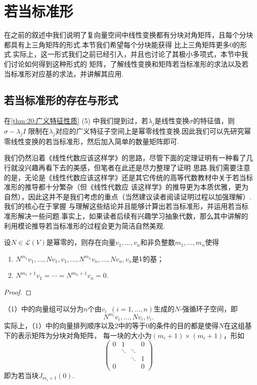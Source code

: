\chapter{若当标准形}

在之前的叙述中我们说明了复向量空间中线性变换都有分块对角矩阵，且每个分块都具有上三角矩阵的形式.本节我们希望每个分块能获得
比上三角矩阵更多0的形式.实际上，这一形式我们之前已经引入，并且也讨论了其极小多项式，本节中我们讨论如何得到这种形式的
矩阵，了解线性变换和矩阵若当标准形的求法以及若当标准形对应基的求法，并讲解其应用.

\section{若当标准形的存在与形式}
在\autoref{thm:20:广义特征性质} (5) 中我们提到过，若$\lambda_j$是线性变换$\sigma$的特征值，则$\sigma-\lambda_jI$
限制在$\lambda_j$对应的广义特征子空间上是幂零线性变换.因此我们可以先研究幂零线性变换的若当标准形，然后加入简单的数量矩阵即可.

我们仍然沿着《线性代数应该这样学》的思路，尽管下面的定理证明有一种看了几行就没兴趣再看下去的美感，但笔者在此还是尽力整理了证明
思路.我们需要注意的是，无论是《线性代数应该这样学》还是其它传统的高等代数教材中关于若当标准形的推导都十分繁杂（但《线性代数应
该这样学》的推导更为本质优雅，更为自然），因此这并不是我们考虑的重点（当然建议读者阅读证明过程以加强理解）.我们的核心在于掌握
与理解这些结论并且能够计算出若当标准形，并运用若当标准形解决一些问题.事实上，如果读者后续有兴趣学习抽象代数，那么其中讲解的
利用模论推导若当标准形的过程会更为简洁自然美观.
\begin{theorem} \label{thm:22:若当基存在}
    设$N\in \mathcal{L}(V)$是幂零的，则存在向量$v_1,\ldots,v_n$和非负整数$m_1,\ldots,m_n$使得
    \begin{enumerate}[label=(\arabic*)]
        \item $N^{m_1}v_1,\ldots,Nv_1,v_1,\ldots,N^{m_n}v_n,\ldots,Nv_n,v_n$是$V$的基；

        \item $N^{m_1+1}v_1=\cdots=N^{m_n+1}v_n=0$.
    \end{enumerate}
\end{theorem}
\begin{proof}
    
\end{proof}

（1）中的向量组可以分为$n$个由$v_i\enspace(i=1,\ldots,n)$生成的$N$-强循环子空间，即
\[N^{m_i}v_i,\ldots,Nv_i,v_i.\]
实际上，（1）中的向量排列顺序以及2中的等于0的条件的目的都是使得$N$在这组基下的表示矩阵为分块对角矩阵，
每一块的大小为$(m_i+1)\times(m_i+1)$，形如\[\begin{pmatrix}
    0 & 1 &  & 0 \\  & \ddots & \ddots &  \\  &  &  \ddots & 1 \\ 0 &  &  & 0
\end{pmatrix}\]即为若当块$J_{m_i+1}(0)$.

